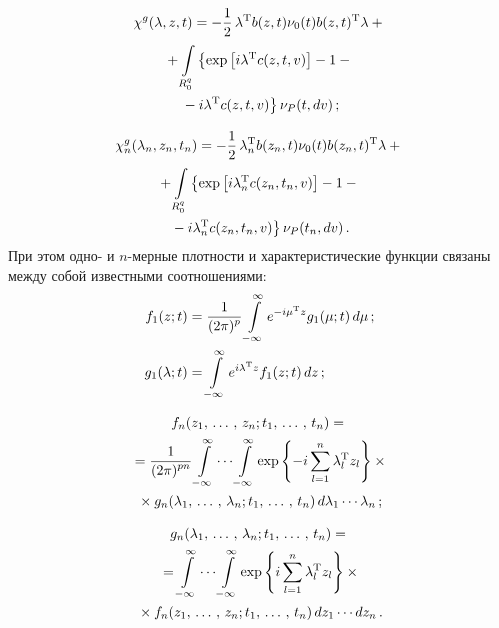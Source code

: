 \begin{multicols}{2}
    \vspace*{-14pt}

    \noindent
\begin{multline}
        \chi^g (\lambda,z, t) =-\displaystyle\frac{\displaystyle 1\mathstrut}{\displaystyle 2\mathstrut}\, \lambda^{\mathrm{T}} b(z,t) \nu_0(t) b(z,t)^{\mathrm{T}}\lambda +{}\\
{}+ \int\limits_{R_0^q} \left\{ \exp \left[ i\lambda^{\mathrm{T}} c(z,t,v) \right]
    -1 -{}\right.\\
\left.    {}-i\lambda^{\mathrm{T}} c(z, t,v)\right\} \nu_P (t,dv)\,;
    \label{e2.15-s}
    \end{multline}


    \vspace*{-14pt}

    \noindent
\begin{multline*}
\chi^g_n (\lambda_n,z_n, t_n) =-\displaystyle\frac{\displaystyle 1\mathstrut}{\displaystyle 2\mathstrut}\, \lambda^{\mathrm{T}}_n b(z_n,t) \nu_0(t) b(z_n,t)^{\mathrm{T}}\lambda +{}\\
{}+ \int\limits_{R_0^q} \left\{ \exp \left[ i\lambda^{\mathrm{T}}_n c(z_n,t_n,v) \right]
    -1 -{}\right.\\
\left.    {}-i\lambda^{\mathrm{T}}_n c(z_n, t_n,v)\right\} \nu_P (t_n,dv)\,.
    \end{multline*}
При этом одно- и $n$-мер\-ные плотности и характеристические функции связаны
между собой известными соотношениями:
\begin{align*}
f_1(z;t) &=\displaystyle \displaystyle\frac{\displaystyle 1\mathstrut}{\displaystyle (2\pi)^{p}\mathstrut} \int\limits_{-\infty}^\infty e^{-i\mu^{\mathrm{T}} z} g_1(\mu;t)\, d\mu\,;\\
    g_1(\lambda;t) &= \int\limits_{-\infty}^\infty e^{i\lambda^{\mathrm{T}} z} f_1(z;t) \,dz\,;
    \end{align*}

    \vspace*{-14pt}

    \noindent
\begin{multline*}
f_n( z_1,\,\ldots\,,\, z_n; t_1,\,\ldots\,,\, t_n) ={}\\
{}=\displaystyle\frac{\displaystyle 1\mathstrut}{\displaystyle (2\pi)^{pn}\mathstrut} \int\limits_{-\infty}^\infty\cdots \int\limits_{-\infty}^\infty \exp
    \left\{ - i \sum\limits_{l=1}^n \lambda_l^{\mathrm{T}} z_l\right\} \times{}\\
{}\times g_n (\lambda_1,\,\ldots\,,\, \lambda_n; t_1,\,\ldots\,,\, t_n)\, d\lambda_1\cdots \lambda_n\,;
\end{multline*}

\vspace*{-12pt}

\noindent
\begin{multline*}
g_n (\lambda_1,\,\ldots\,,\, \lambda_n; t_1,\,\ldots\,,\, t_n) ={}\\
{}=\int\limits_{-\infty}^\infty\cdots \int\limits_{-\infty}^\infty \exp
    \left\{ i \sum\limits_{l=1}^n \lambda_l^{\mathrm{T}} z_l\right\} \times{}\\
{}\times f_n (z_1,\,\ldots\,,\, z_n; t_1,\,\ldots\,,\, t_n) \,dz_1\cdots dz_n\,.
    \end{multline*}


\end{multicols}

